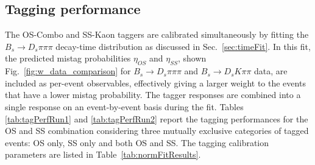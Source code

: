 %
%
%
%


\clearpage
\subsection{Tagging performance}
\label{subsec:TaggingComparison}

The OS-Combo and SS-Kaon taggers are calibrated simultaneously by fitting the $B_s \to D_s \pi\pi\pi$ decay-time distribution as discussed in Sec.~\ref{sec:timeFit}.
In this fit, the predicted mistag probabilities $\eta_{OS}$ and $\eta_{SS}$, shown Fig.~\ref{fig:w_data_comparison} for $B_s \to D_s \pi\pi\pi$ and $B_s \to D_s K\pi\pi$ data,
are included as per-event observables, effectively giving a larger weight to the events that have a lower mistag probability.
The tagger responses are combined into a single response on an event-by-event basis during the fit.
Tables \ref{tab:tagPerfRun1} and \ref{tab:tagPerfRun2} report the tagging performances for the OS and SS combination 
considering three mutually exclusive categories of tagged events: OS only, SS only and both OS and SS.
The tagging calibration parameters are listed in Table~\ref{tab:normFitResults}.

